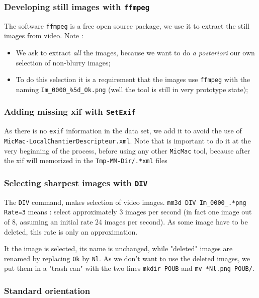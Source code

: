 \subsubsection{Developing still images with  {\tt ffmpeg}}

The software  {\tt ffmpeg} is a free open source package, we use it to extract the still images from video. Note :

\begin{itemize}
   \item We ask to extract \emph{all} the images, because we want to do  \emph{a posteriori} our own selection 
         of non-blurry images;
   \item To do this selection it is a requirement that the images use {\tt ffmpeg}  with the naming
          {\tt Im\_0000\_\%5d\_Ok.png}  (well the tool is still in very prototype state);

\end{itemize}


\subsubsection{Adding missing xif with {\tt SetExif}}

As there is no {\tt exif} information in the data set, we  add it to avoid the use of {\tt MicMac-LocalChantierDescripteur.xml}.
Note that is important to do it at the very beginning of the process, before using any other {\tt MicMac} tool, because after the xif 
will memorized in the {\tt Tmp-MM-Dir/.*xml} files


\subsubsection{Selecting sharpest images with  {\tt DIV}}

The {\tt DIV} command, makes selection of video images.
{\tt mm3d DIV Im\_0000\_.*png Rate=3} means : select approximately $3$ images per second 
(in fact one image out of $8$, assuming an initial rate $24$ images per second).  As some image have to be deleted,
this rate is only an approximation.

It the image is selected, its name is unchanged, while "deleted" images are renamed by replacing {\tt Ok} by {\tt Nl}.
As we don't want to use the deleted images, we put them in a "trash can" with the two lines 
{\tt mkdir POUB} and {\tt mv *Nl.png POUB/}.


\subsubsection{Standard orientation}

